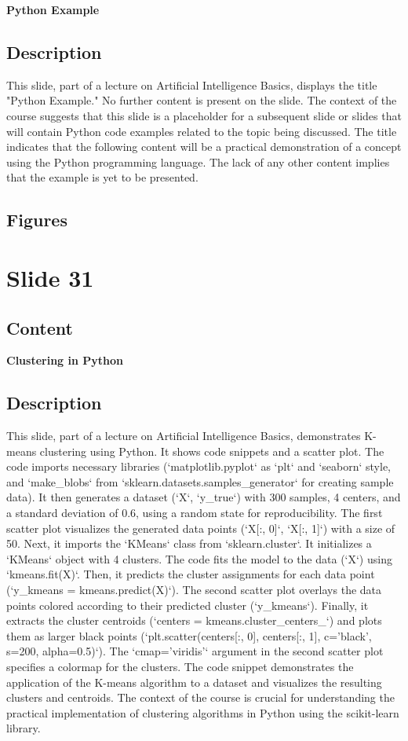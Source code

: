 \documentclass{article}%
\begin{document}
\textbf{Python Example}
%
\subsection{Description}%
This slide, part of a lecture on Artificial Intelligence Basics, displays the title "Python Example."  No further content is present on the slide.  The context of the course suggests that this slide is a placeholder for a subsequent slide or slides that will contain Python code examples related to the topic being discussed.  The title indicates that the following content will be a practical demonstration of a concept using the Python programming language.  The lack of any other content implies that the example is yet to be presented.%
\subsection{Figures}%
\begin{figure}[H]%
\centering%
\end{figure}

%
\newpage%
\section{Slide 31}%
\label{sec:Slide31}%
\subsection{Content}%

\textbf{Clustering in Python}
%
\subsection{Description}%
This slide, part of a lecture on Artificial Intelligence Basics, demonstrates K-means clustering using Python.  It shows code snippets and a scatter plot.  The code imports necessary libraries (`matplotlib.pyplot` as `plt` and `seaborn` style, and `make_blobs` from `sklearn.datasets.samples_generator` for creating sample data).  It then generates a dataset (`X`, `y_true`) with 300 samples, 4 centers, and a standard deviation of 0.6, using a random state for reproducibility.  The first scatter plot visualizes the generated data points (`X[:, 0]`, `X[:, 1]`) with a size of 50.  Next, it imports the `KMeans` class from `sklearn.cluster`.  It initializes a `KMeans` object with 4 clusters.  The code fits the model to the data (`X`) using `kmeans.fit(X)`.  Then, it predicts the cluster assignments for each data point (`y_kmeans = kmeans.predict(X)`).  The second scatter plot overlays the data points colored according to their predicted cluster (`y_kmeans`).  Finally, it extracts the cluster centroids (`centers = kmeans.cluster_centers_`) and plots them as larger black points (`plt.scatter(centers[:, 0], centers[:, 1], c='black', s=200, alpha=0.5)`).  The `cmap='viridis'` argument in the second scatter plot specifies a colormap for the clusters. The code snippet demonstrates the application of the K-means algorithm to a dataset and visualizes the resulting clusters and centroids. The context of the course is crucial for understanding the practical implementation of clustering algorithms in Python using the scikit-learn library.%
\end{document}
